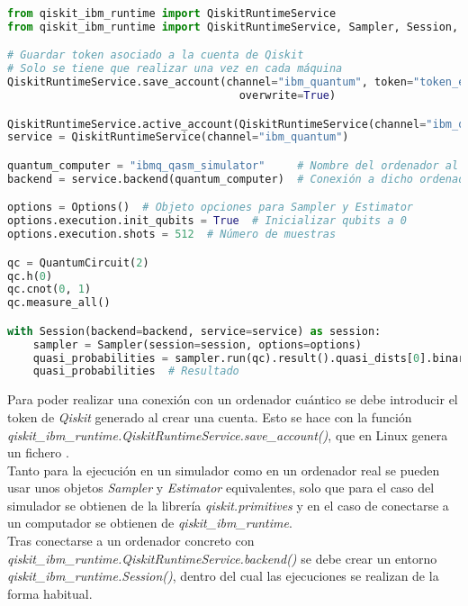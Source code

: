 \begin{lstlisting}[language=Python,label=cod:8-ejecucion_qiskit_real,caption={Ejemplo de ejecución en computador real de Qiskit},style=numbered]
from qiskit_ibm_runtime import QiskitRuntimeService
from qiskit_ibm_runtime import QiskitRuntimeService, Sampler, Session, Options

# Guardar token asociado a la cuenta de Qiskit
# Solo se tiene que realizar una vez en cada máquina
QiskitRuntimeService.save_account(channel="ibm_quantum", token="token_ejemplo",
                                    overwrite=True)

QiskitRuntimeService.active_account(QiskitRuntimeService(channel="ibm_quantum"))
service = QiskitRuntimeService(channel="ibm_quantum")

quantum_computer = "ibmq_qasm_simulator"     # Nombre del ordenador al que conectarse
backend = service.backend(quantum_computer)  # Conexión a dicho ordenador

options = Options()  # Objeto opciones para Sampler y Estimator
options.execution.init_qubits = True  # Inicializar qubits a 0
options.execution.shots = 512  # Número de muestras

qc = QuantumCircuit(2)
qc.h(0)
qc.cnot(0, 1)
qc.measure_all()

with Session(backend=backend, service=service) as session:
    sampler = Sampler(session=session, options=options)
    quasi_probabilities = sampler.run(qc).result().quasi_dists[0].binary_probabilities()
    quasi_probabilities  # Resultado
\end{lstlisting}

Para poder realizar una conexión con un ordenador cuántico se debe introducir el token de \textit{Qiskit} generado al crear una cuenta.
Esto se hace con la función \textit{qiskit\_ibm\_runtime.QiskitRuntimeService.save\_account()}, que en Linux genera un fichero .
\\
Tanto para la ejecución en un simulador como en un ordenador real se pueden usar unos objetos \textit{Sampler} y \textit{Estimator} equivalentes, solo que para el caso del simulador se obtienen de la librería \textit{qiskit.primitives} y en el caso de conectarse a un computador se obtienen de \textit{qiskit\_ibm\_runtime}.
\\
Tras conectarse a un ordenador concreto con \textit{qiskit\_ibm\_runtime.QiskitRuntimeService.backend()} se debe crear un entorno \textit{qiskit\_ibm\_runtime.Session()}, dentro del cual las ejecuciones se realizan de la forma habitual.


